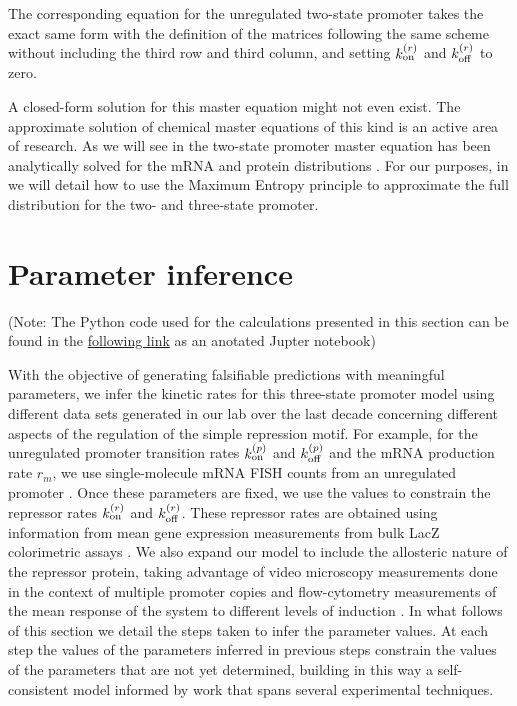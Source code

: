 The corresponding equation for the unregulated two-state promoter takes the
exact same form with the definition of the matrices following the same scheme
without including the third row and third column, and setting $k^{(r)}_{\text{on}}$ and
$k^{(r)}_{\text{off}}$ to zero.

A closed-form solution for this master equation might not even exist. The
approximate solution of chemical master equations of this kind is an active
area of research. As we will see in  the two-state
promoter master equation has been analytically solved for the mRNA
\cite{Peccoud1995} and protein distributions \cite{Shahrezaei2008}. For our
purposes, in  we will detail how to use the Maximum Entropy
principle to approximate the full distribution for the two- and three-state
promoter.

\section{Parameter inference}\label{supp_param_inference}

(Note: The Python code used for the calculations presented in this section can
be found in the
\href{https://www.rpgroup.caltech.edu//chann_cap/software/chemical_master_mRNA_FISH_mcmc.html}{following
link} as an anotated Jupter notebook)

With the objective of generating falsifiable predictions with meaningful
parameters, we infer the kinetic rates for this three-state promoter model
using different data sets generated in our lab over the last decade concerning
different aspects of the regulation of the simple repression motif. For
example, for the unregulated promoter transition rates $k^{(p)}_{\text{on}}$ and $k^{(p)}_{\text{off}}$ and
the mRNA production rate $r_m$, we use single-molecule mRNA FISH counts from an
unregulated promoter \cite{Jones2014a}. Once these parameters are fixed, we use
the values to constrain the repressor rates $k^{(r)}_{\text{on}}$ and $k^{(r)}_{\text{off}}$. These
repressor rates are obtained using information from mean gene expression
measurements from bulk LacZ colorimetric assays \cite{Garcia2011c}. We also
expand our model to include the allosteric nature of the repressor protein,
taking advantage of video microscopy measurements done in the context of
multiple promoter copies \cite{Brewster2014} and flow-cytometry measurements of
the mean response of the system to different levels of induction
\cite{Razo-Mejia2018}. In what follows of this section we detail the steps
taken to infer the parameter values. At each step the values of the parameters
inferred in previous steps constrain the values of the parameters that are not
yet determined, building in this way a self-consistent model informed by work
that spans several experimental techniques.

